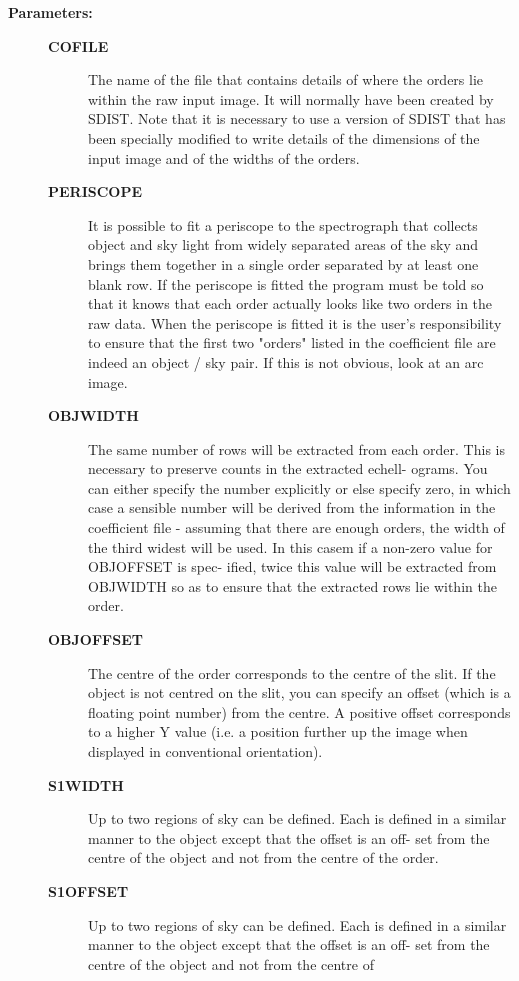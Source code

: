 \begin{description}
\item [{\bf Parameters:}]
\begin{description}
\item [{\bf COFILE}]
 The name of the file that contains details of where the orders
 lie within the raw input image.  It will normally have been
 created by SDIST.  Note that it is necessary to use a version
 of SDIST that has been specially modified to write details of
 the dimensions of the input image and of the widths of the orders.
\item [{\bf PERISCOPE}]
 It is possible to fit a periscope to the spectrograph that
 collects object and sky light from widely separated areas of
 the sky and brings them together in a single order separated
 by at least one blank row. If the periscope is fitted the
 program must be told so that it knows that each order actually
 looks like two orders in the raw data. When the periscope is
 fitted it is the user's responsibility to ensure that the
 first two "orders" listed in the coefficient file are indeed
 an object / sky pair. If this is not obvious, look at an arc
 image.
\item [{\bf OBJWIDTH}]
 The same number of rows will be extracted from each order.
 This is necessary to preserve counts in the extracted echell-
 ograms. You can either specify the number explicitly or else
 specify zero, in which case a sensible number will be derived
 from the information in the coefficient file - assuming that
 there are enough orders, the width of the third widest will be
 used. In this casem if a non-zero value for OBJOFFSET is spec-
 ified, twice this value will be extracted from OBJWIDTH so
 as to ensure that the extracted rows lie within the order.
\item [{\bf OBJOFFSET}]
 The centre of the order corresponds to the centre of the slit.
 If the object is not centred on the slit, you can specify an
 offset (which is a floating point number) from the centre. A
 positive offset corresponds to a higher Y value (i.e. a position
 further up the image when displayed in conventional orientation).
\item [{\bf S1WIDTH}]
 Up to two regions of sky can be defined. Each is defined in a
 similar manner to the object except that the offset is an off-
 set from the centre of the object and not from the centre of
 the order.
\item [{\bf S1OFFSET}]
 Up to two regions of sky can be defined. Each is defined in a
 similar manner to the object except that the offset is an off-
 set from the centre of the object and not from the centre of

\end{description}
\end{description}
